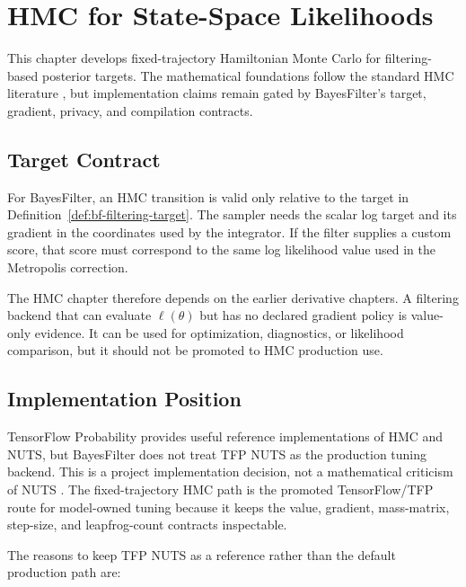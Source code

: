 \chapter{HMC for State-Space Likelihoods}
\label{ch:bf-hmc-for-state-space}

This chapter develops fixed-trajectory Hamiltonian Monte Carlo for
filtering-based posterior targets.  The mathematical foundations follow the
standard HMC literature \citep{neal2011mcmc,betancourt2017conceptual}, but
implementation claims remain gated by BayesFilter's target, gradient, privacy,
and compilation contracts.

\section{Target Contract}
\label{sec:bf-hmc-target-contract}

For BayesFilter, an HMC transition is valid only relative to the target in
Definition~\ref{def:bf-filtering-target}.  The sampler needs the scalar log
target and its gradient in the coordinates used by the integrator.  If the
filter supplies a custom score, that score must correspond to the same log
likelihood value used in the Metropolis correction.

The HMC chapter therefore depends on the earlier derivative chapters.  A
filtering backend that can evaluate $\ell(\theta)$ but has no declared gradient
policy is value-only evidence.  It can be used for optimization, diagnostics,
or likelihood comparison, but it should not be promoted to HMC production use.

\section{Implementation Position}
\label{sec:bf-hmc-implementation-position}

TensorFlow Probability provides useful reference implementations of HMC and
NUTS, but BayesFilter does not treat TFP NUTS as the production tuning backend.
This is a project implementation decision, not a mathematical criticism of
NUTS \citep{hoffman2014nuts}.  The fixed-trajectory HMC path is the promoted
TensorFlow/TFP route for model-owned tuning because it keeps the value,
gradient, mass-matrix, step-size, and leapfrog-count contracts inspectable.

The reasons to keep TFP NUTS as a reference rather than the default production
path are:


